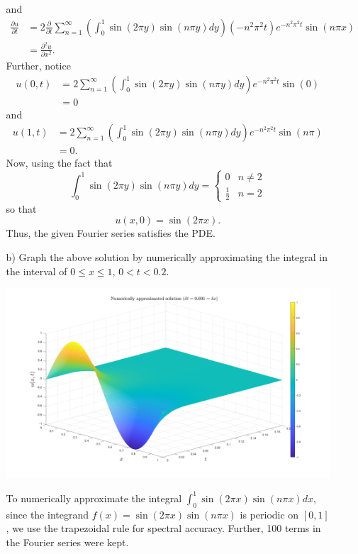 \documentclass{article}
\begin{document}
\begin{itemize}
\begin{itemize}
    and 
    \begin{align*}
        \frac{\partial u}{\partial t} &= 2\frac{\partial}{\partial t}\sum_{n = 1}^{\infty} \left(\int_0^1 \sin(2\pi y)\sin(n\pi y)dy\right) (-n^2\pi^2t)e^{-n^2\pi^2t} \sin(n\pi x)\\
        &= \frac{\partial^2u}{\partial x^2}.
    \end{align*}
    Further, notice 
    \begin{align*}
        u(0,t) &= 2\sum_{n = 1}^{\infty} \left(\int_0^1\sin(2\pi y)\sin(n\pi y)dy\right)e^{-n^2\pi^2t}\sin(0)\\
        &= 0
    \end{align*}
    and
    \begin{align*}
        u(1,t) &= 2\sum_{n = 1}^{\infty} \left(\int_0^1\sin(2\pi y)\sin(n \pi y)dy\right) e^{-n^2\pi^2 t}\sin(n\pi)\\
        &= 0.
    \end{align*}
    Now, using the fact that
    \[\int_0^1\sin(2\pi y)\sin(n\pi y)dy = \begin{cases}
        0 & n \neq 2\\
        \frac{1}{2} & n = 2
    \end{cases}\]
    so that 
    \[u(x,0) = \sin(2\pi x).\]
    Thus, the given Fourier series satisfies the PDE.
   

    \item[b)] Graph the above solution by numerically approximating the integral in the interval of $0 \leq x \leq 1$, $0 < t < 0.2$.
    \newline\newline
    \begin{center}
        \includegraphics[scale = 0.25]{wave_eq_sol_numerical.png}
    \end{center}
    To numerically approximate the integral ${\displaystyle \int_0^1 \sin(2\pi x)\sin(n\pi x) dx }$, since the integrand $f(x) = \sin(2\pi x)\sin(n \pi x)$ is periodic on $[0,1]$, we use the trapezoidal rule for spectral accuracy. Further, 100 terms in the Fourier series were kept.
    

    \end{itemize}
    
\end{itemize}
\end{document}
